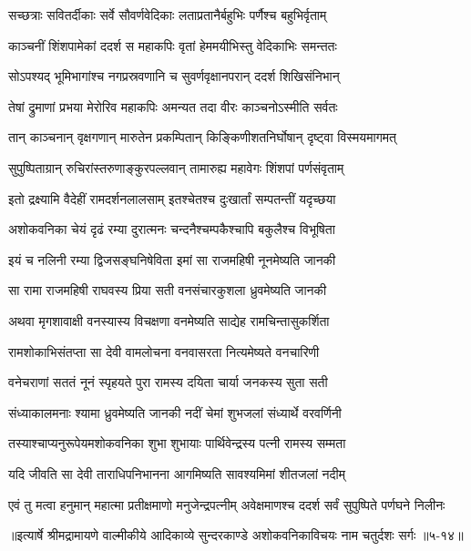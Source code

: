 \twolineshloka
{सच्छत्राः सवितर्दीकाः सर्वे सौवर्णवेदिकाः}
{लताप्रतानैर्बहुभिः पर्णैश्च बहुभिर्वृताम्} %

\twolineshloka
{काञ्चनीं शिंशपामेकां ददर्श स महाकपिः}
{वृतां हेममयीभिस्तु वेदिकाभिः समन्ततः} %

\twolineshloka
{सोऽपश्यद् भूमिभागांश्च नगप्रस्रवणानि च}
{सुवर्णवृक्षानपरान् ददर्श शिखिसंनिभान्} %

\twolineshloka
{तेषां द्रुमाणां प्रभया मेरोरिव महाकपिः}
{अमन्यत तदा वीरः काञ्चनोऽस्मीति सर्वतः} %

\twolineshloka
{तान् काञ्चनान् वृक्षगणान् मारुतेन प्रकम्पितान्}
{किङ्किणीशतनिर्घोषान् दृष्ट्वा विस्मयमागमत्} %

\twolineshloka
{सुपुष्पिताग्रान् रुचिरांस्तरुणाङ्कुरपल्लवान्}
{तामारुह्य महावेगः शिंशपां पर्णसंवृताम्} %

\twolineshloka
{इतो द्रक्ष्यामि वैदेहीं रामदर्शनलालसाम्}
{इतश्चेतश्च दुःखार्तां सम्पतन्तीं यदृच्छया} %

\twolineshloka
{अशोकवनिका चेयं दृढं रम्या दुरात्मनः}
{चन्दनैश्चम्पकैश्चापि बकुलैश्च विभूषिता} %

\twolineshloka
{इयं च नलिनी रम्या द्विजसङ्घनिषेविता}
{इमां सा राजमहिषी नूनमेष्यति जानकी} %

\twolineshloka
{सा रामा राजमहिषी राघवस्य प्रिया सती}
{वनसंचारकुशला ध्रुवमेष्यति जानकी} %

\twolineshloka
{अथवा मृगशावाक्षी वनस्यास्य विचक्षणा}
{वनमेष्यति साद्येह रामचिन्तासुकर्शिता} %

\twolineshloka
{रामशोकाभिसंतप्ता सा देवी वामलोचना}
{वनवासरता नित्यमेष्यते वनचारिणी} %

\twolineshloka
{वनेचराणां सततं नूनं स्पृहयते पुरा}
{रामस्य दयिता चार्या जनकस्य सुता सती} %

\twolineshloka
{संध्याकालमनाः श्यामा ध्रुवमेष्यति जानकी}
{नदीं चेमां शुभजलां संध्यार्थे वरवर्णिनी} %

\twolineshloka
{तस्याश्चाप्यनुरूपेयमशोकवनिका शुभा}
{शुभायाः पार्थिवेन्द्रस्य पत्नी रामस्य सम्मता} %

\twolineshloka
{यदि जीवति सा देवी ताराधिपनिभानना}
{आगमिष्यति सावश्यमिमां शीतजलां नदीम्} %

\twolineshloka
{एवं तु मत्वा हनुमान् महात्मा प्रतीक्षमाणो मनुजेन्द्रपत्नीम्}
{अवेक्षमाणश्च ददर्श सर्वं सुपुष्पिते पर्णघने निलीनः} %


॥इत्यार्षे श्रीमद्रामायणे वाल्मीकीये आदिकाव्ये सुन्दरकाण्डे अशोकवनिकाविचयः नाम चतुर्दशः सर्गः ॥५-१४॥
